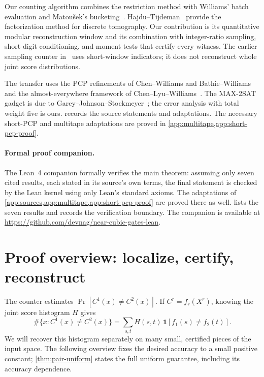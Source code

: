 \documentclass[11pt,letterpaper]{article}
\theoremstyle{definition}
\theoremstyle{remark}
\newcommand{\ind}{\mathbf 1}
\begin{document}
Our counting algorithm combines the restriction method with
Williams' batch evaluation and Matou\v{s}ek's
bucketing~\cite{KW16,CTW26,WilACC14,Mat91}. Hajdu--Tijdeman~\cite{HT01}
provide the factorization method for discrete tomography. Our
contribution is its quantitative modular reconstruction window and
its combination with integer-ratio sampling, short-digit conditioning,
and moment tests that certify every witness. The earlier sampling
counter in~\cite[Sections~4.1--4.2]{NagGate} uses short-window
indicators; it does not reconstruct whole joint score distributions.

The transfer uses the PCP refinements of Chen--Williams and
Bathie--Williams~\cite{CW19,BW24} and the almost-everywhere framework
of Chen--Lyu--Williams~\cite{CLW20}. The MAX-2SAT gadget is due to
Garey--Johnson--Stockmeyer~\cite{GJS76}; the error analysis with total
weight five is ours.  records the source statements
and adaptations. The necessary short-PCP and multitape adaptations
are proved in \cref{app:multitape,app:short-pcp-proof}.

\paragraph{Formal proof companion.}
The Lean~4 companion formally verifies the main theorem: assuming only
seven cited results, each stated in its source's own terms, the final
statement is checked by the Lean kernel using only Lean's standard
axioms. The adaptations of
\cref{app:sources,app:multitape,app:short-pcp-proof} are proved there as
well.  lists the seven results and records
the verification boundary. The companion is available at
\url{https://github.com/devnag/near-cubic-gates-lean}.

\section{Proof overview: localize, certify, reconstruct}
\label{sec:overview}\label{sec:idea}

The counter estimates \(\Pr[C^1(x)\ne C^2(x)]\). If
\(C^r=f_r(X^r)\), knowing the joint score histogram \(H\) gives
\[
 \#\{x:C^1(x)\ne C^2(x)\}
   =\sum_{s,t}H(s,t)\,\ind[f_1(s)\ne f_2(t)].
\]
We will recover this histogram separately on many small, certified
pieces of the input space. The following overview fixes the desired
accuracy to a small positive constant; \cref{thm:pair-uniform}
states the full uniform guarantee, including its accuracy dependence.
\end{document}
